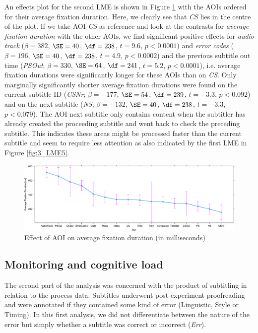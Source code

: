 \documentclass[output=paper]{langscibook}
\begin{document}
An effects plot for the second LME is shown in Figure \ref{fig:4_LME4} with the AOIs ordered for their average fixation duration.
Here, we clearly see that \textit{CS} lies in the centre of the plot.
If we take AOI \textit{CS} as reference and look at the contrasts for \textit{average fixation duration} with the other AOIs, we find significant positive effects for \textit{audio track} ($\beta=382$, $\SE=40$, $\df=238$, $t=9.6$, $p<0.0001$) and \textit{error codes} ($\beta=196$, $\SE=40$, $\df=238$, $t=4.9$, $p<0.0002$) and the previous subtitle out time (\textit{PSOut}; $\beta=330$, $\SE=64$, $\df=241$, $t=5.2$, $p<0.0001$), i.e.
average fixation durations were significantly longer for these AOIs than on \textit{CS}.
Only marginally significantly shorter average fixation durations were found on the current subtitle ID (\textit{CSNr}; $\beta=-177$, $\SE=54$, $\df=239$, $t=-3.3$, $p<0.092$) and on the next subtitle (\textit{NS}; $\beta=-132$, $\SE=40$, $\df=238$, $t=-3.3$, $p<0.079$).
The AOI next subtitle only contains content when the subtitler has already created the proceeding subtitle and went back to check the preceding subtitle.
This indicates these areas might be processed faster than the current subtitle and seem to require less attention as also indicated by the first LME in Figure \ref{fig:3_LME5}.

\begin{figure}
\includegraphics[width=1\textwidth]{figures/LME2_AvgFixDur_AOI.pdf}
%
\caption{Effect of AOI on average fixation duration (in milliseconds)\label{fig:4_LME4}}
\end{figure}
 
\subsection{Monitoring and cognitive load}
The second part of the analysis was concerned with the product of subtitling in relation to the process data.
Subtitles underwent post-experiment proofreading and were annotated if they contained some kind of error (Linguistic, Style or Timing).
In this first analysis, we did not differentiate between the nature of the error but simply whether a subtitle was correct or incorrect (\textit{Err}).
\end{document}
